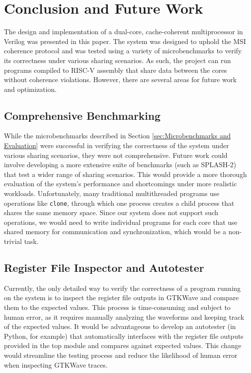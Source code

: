 \documentclass[10pt, compsoc]{IEEEtran}
\begin{document}
\section{Conclusion and Future Work}\label{sec:Conclusion}

The design and implementation of a dual-core, cache-coherent multiprocessor in Verilog was presented in this paper. The system was designed to uphold the MSI coherence protocol and was tested using a variety of microbenchmarks to verify its correctness under various sharing scenarios. As such, the project can run programs compiled to RISC-V assembly that share data between the cores without coherence violations. However, there are several areas for future work and optimization. 



\subsection*{Comprehensive Benchmarking} 

While the microbenchmarks described in Section \ref{sec:Microbenchmarks and Evaluation} were successful in verifying the correctness of the system under various sharing scenarios, they were not comprehensive. Future work could involve developing a more extensive suite of benchmarks (such as SPLASH-2) that test a wider range of sharing scenarios. This would provide a more thorough evaluation of the system's performance and shortcomings under more realistic workloads. Unfortunately, many traditional multithreaded programs use operations like \texttt{clone}, through which one process creates a child process that shares the same memory space. Since our system does not support such operations, we would need to write individual programs for each core that use shared memory for communication and synchronization, which would be a non-trivial task. 



\subsection*{Register File Inspector and Autotester}

Currently, the only detailed way to verify the correctness of a program running on the system is to inspect the register file outputs in GTKWave and compare them to the expected values. This process is time-consuming and subject to human error, as it requires manually analyzing the waveforms and keeping track of the expected values. It would be advantageous to develop an autotester (in Python, for example) that automatically interfaces with the register file outputs provided in the top module and compares against expected values. This change would streamline the testing process and reduce the likelihood of human error when inspecting GTKWave traces. 
\end{document}
